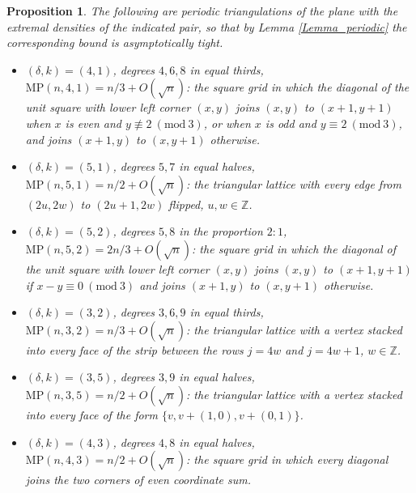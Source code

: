 \documentclass[12pt,a4paper]{article}%
\newtheorem{proposition}[theorem]{Proposition}
\begin{document}
\begin{proposition}
\label{Prop_hand}The following are periodic triangulations of the plane with the extremal densities of the indicated
pair, so that by Lemma \ref{Lemma_periodic} the corresponding bound is asymptotically tight.

\begin{itemize}
\item[\textrm{(a)}] $(\delta ,k)=(4,1)$, degrees $4,6,8$ in equal thirds, $\mathrm{MP}(n,4,1)=n/3+O(\sqrt{n})$:
the square grid in which the diagonal of the unit square with lower left corner $(x,y)$ joins $(x,y)$ to $(x+1,y+1)$
when $x$ is even and $y\not \equiv 2\ (\mathrm{mod}\ 3)$, or when $x$ is odd and $y\equiv 2\ (\mathrm{mod}\ 3)$, and
joins $(x+1,y)$ to $(x,y+1)$ otherwise.

\item[\textrm{(b)}] $(\delta ,k)=(5,1)$, degrees $5,7$ in equal halves, $\mathrm{MP}(n,5,1)=n/2+O(\sqrt{n})$:
the triangular lattice with every edge from $(2u,2w)$ to $(2u+1,2w)$ flipped, $u,w\in \mathbb{Z}$.

\item[\textrm{(c)}] $(\delta ,k)=(5,2)$, degrees $5,8$ in the proportion $2{:}1$, $\mathrm{MP}(n,5,2)=2n/3+O(\sqrt{n})$:
the square grid in which the diagonal of the unit square with lower left corner $(x,y)$ joins $(x,y)$ to $(x+1,y+1)$ if
$x-y\equiv 0\ (\mathrm{mod}\ 3)$ and joins $(x+1,y)$ to $(x,y+1)$ otherwise.

\item[\textrm{(d)}] $(\delta ,k)=(3,2)$, degrees $3,6,9$ in equal thirds, $\mathrm{MP}(n,3,2)=n/3+O(\sqrt{n})$: the
triangular lattice with a vertex stacked into every face of the strip between the rows $j=4w$ and $j=4w+1$, $w\in
\mathbb{Z}$.

\item[\textrm{(e)}] $(\delta ,k)=(3,5)$, degrees $3,9$ in equal halves, $\mathrm{MP}(n,3,5)=n/2+O(\sqrt{n})$: the
triangular lattice with a vertex stacked into every face of the form $\{v,v+(1,0),v+(0,1)\}$.

\item[\textrm{(f)}] $(\delta ,k)=(4,3)$, degrees $4,8$ in equal halves, $\mathrm{MP}(n,4,3)=n/2+O(\sqrt{n})$: the
square grid in which every diagonal joins the two corners of even coordinate sum.
\end{itemize}
\end{proposition}
\end{document}
